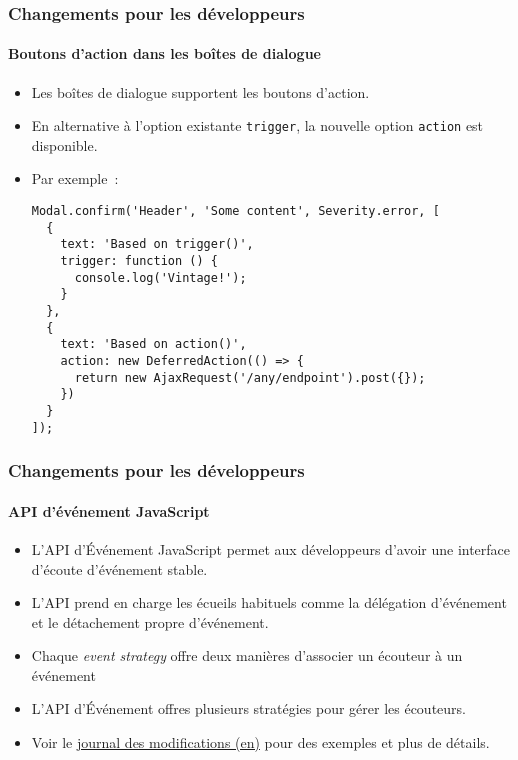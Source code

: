 
\begin{frame}[fragile]
	\frametitle{Changements pour les développeurs}
	\framesubtitle{Boutons d'action dans les boîtes de dialogue}

	\lstset{basicstyle=\tiny\ttfamily}

	\begin{itemize}
		\item Les boîtes de dialogue supportent les boutons d'action.
		\item En alternative à l'option existante \texttt{trigger}, la nouvelle
			option \texttt{action} est disponible.
		\item Par exemple~:

\vspace{-0.4cm}
\begin{lstlisting}
Modal.confirm('Header', 'Some content', Severity.error, [
  {
    text: 'Based on trigger()',
    trigger: function () {
      console.log('Vintage!');
    }
  },
  {
    text: 'Based on action()',
    action: new DeferredAction(() => {
      return new AjaxRequest('/any/endpoint').post({});
    })
  }
]);
\end{lstlisting}

	\end{itemize}

\end{frame}


\begin{frame}[fragile]
	\frametitle{Changements pour les développeurs}
	\framesubtitle{API d'événement JavaScript}

	\begin{itemize}
		\item L'API d'Événement JavaScript permet aux développeurs d'avoir une
			interface d'écoute d'événement stable.
		\item L'API prend en charge les écueils habituels comme la délégation
			d'événement et le détachement propre d'événement.
		\item Chaque \textit{event strategy} offre deux manières d'associer un
			écouteur à un événement
		\item L'API d'Événement offres plusieurs stratégies pour gérer les écouteurs.
		\item Voir le
			\href{https://docs.typo3.org/c/typo3/cms-core/master/en-us/Changelog/10.3/Feature-90471-JavaScriptEventAPI.html}{journal des modifications (en)}
			pour des exemples et plus de détails.
	\end{itemize}

\end{frame}

